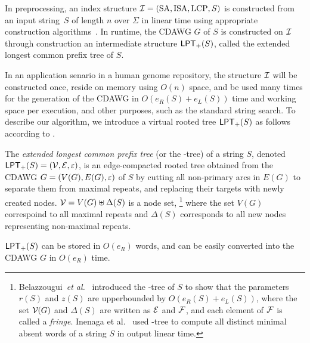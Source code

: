 \documentclass{article}
\begin{document}
In preprocessing, an index structure $\mathcal{I} = (\mathrm{SA}, \mathrm{ISA}, \mathrm{LCP}, S)$ is constructed from an input string~$S$ of length $n$ over $\Sigma$ in linear time using appropriate construction algorithms~\cite{navarro2016cds:book,navarro2021indexing:ii}.
In runtime, the CDAWG $G$ of $S$ is constructed on $\mathcal{I}$ through construction an intermediate structure $\mathsf{LPT}_{+}(S)$, called the extended longest common prefix tree of $S$.

In an application senario in a human genome repository, the structure $\mathcal{I}$ will be constructed once, reside on memory using $O(n)$ space, and be used many times for the generation of the CDAWG in $O({e_R(S) + e_L(S)})$ time and working space per execution, and other purposes, such as the standard string search.
To describe our algorithm, we introduce a virtual rooted tree $\mathsf{LPT}_{+}(S)$ as follows according to \cite{belazzougui:nunial:gagie:prezza:raffinot2015composite,inenaga2024computing}. 

\begin{definition}[informal]\rm 
The \textit{extended longest common prefix tree} (or the \LPTrm-tree) of a string $S$, denoted $\mathsf{LPT}_{+}(S) = (\mathcal{V}, \mathcal{E}, \varepsilon)$, is an edge-compacted rooted tree obtained from the CDAWG $G = (V(G), E(G), \varepsilon)$ of $S$ by cutting all non-primary arcs in $E(G)$ to separate them from maximal repeats, and replacing their targets with newly created nodes.
$\mathcal{V} = V(G)\uplus\Delta(S)$ is a node set,%
\footnote{Belazzougui~\textit{et al.}~\cite{belazzougui:nunial:gagie:prezza:raffinot2015composite} introduced the \LPTrm-tree of $S$ to show that the parameters $r(S)$ and $z(S)$ are upperbounded by $O(e_R(S) + e_L(S))$, where the set $\mathcal{V}_{}(G)$ and $\Delta(S)$ are written as $\mathcal{E}$ and $\mathcal{F}$, and each element of $\mathcal{F}$ is called a \textit{fringe}. Inenaga et al.~\cite{inenaga2024computing} used \LPTrm-tree to compute all distinct minimal absent words of a string $S$ in output linear time. 
}
where the set $V(G)$ correspoind to all maximal repeats and $\Delta(S)$ corresponds to all new nodes representing non-maximal repeats.
\end{definition}

  $\mathsf{LPT}_{+}(S)$ can be stored in $O(e_R)$ words, and can be easily converted into the CDAWG $G$ in $O(e_R)$ time.
\end{document}
